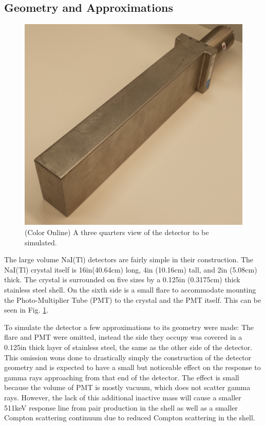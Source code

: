 \documentclass[5p]{elsarticle}
\begin{document}
\subsection{Geometry and Approximations}
\begin{figure}[h]
\begin{center}
\includegraphics[width=\linewidth]{det_images/three_quarters}
\caption{(Color Online) A three quarters view of the detector to be simulated.}
\label{fig-det-three-quart}
\end{center}
\end{figure}
The large volume NaI(Tl) detectors are fairly simple in their construction. The NaI(Tl) crystal itself is 16in(40.64cm) long, 4in (10.16cm) tall, and 2in (5.08cm) thick. The crystal is surrounded on five sizes by a 0.125in (0.3175cm) thick stainless steel shell. On the sixth side is a small flare to accommodate mounting the Photo-Multiplier Tube (PMT) to the crystal and the PMT itself. This can be seen in Fig. \ref{fig-det-three-quart}.

To simulate the detector a few approximations to its geometry were made: The flare and PMT were omitted, instead the side they occupy was covered in a 0.125in thick layer of stainless steel, the same as the other side of the detector. This omission wons done to drastically simply the construction of the detector geometry and is expected to have a small but noticeable effect on the response to gamma rays approaching from that end of the detector. The effect is small because the volume of PMT is mostly vacuum, which does not scatter gamma rays. However, the lack of this additional inactive mass will cause a smaller 511keV response line from pair production in the shell as well as a smaller Compton scattering continuum due to reduced Compton scattering in the shell. 
\end{document}
